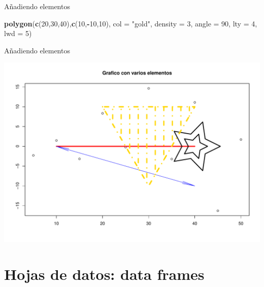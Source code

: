 \documentclass[
  ignorenonframetext,
]{beamer}
\newenvironment{Shaded}{\begin{snugshade}}{\end{snugshade}}
\newcommand{\AttributeTok}[1]{\textcolor[rgb]{0.13,0.29,0.53}{#1}}
\newcommand{\DecValTok}[1]{\textcolor[rgb]{0.00,0.00,0.81}{#1}}
\newcommand{\FunctionTok}[1]{\textcolor[rgb]{0.13,0.29,0.53}{\textbf{#1}}}
\newcommand{\NormalTok}[1]{#1}
\newcommand{\SpecialCharTok}[1]{\textcolor[rgb]{0.81,0.36,0.00}{\textbf{#1}}}
\newcommand{\StringTok}[1]{\textcolor[rgb]{0.31,0.60,0.02}{#1}}
\begin{document}
\begin{frame}[fragile]{Añadiendo elementos}
\begin{Shaded}
\begin{Highlighting}[]
\FunctionTok{polygon}\NormalTok{(}\FunctionTok{c}\NormalTok{(}\DecValTok{20}\NormalTok{,}\DecValTok{30}\NormalTok{,}\DecValTok{40}\NormalTok{),}\FunctionTok{c}\NormalTok{(}\DecValTok{10}\NormalTok{,}\SpecialCharTok{{-}}\DecValTok{10}\NormalTok{,}\DecValTok{10}\NormalTok{), }\AttributeTok{col =} \StringTok{"gold"}\NormalTok{,}
        \AttributeTok{density =} \DecValTok{3}\NormalTok{, }\AttributeTok{angle =} \DecValTok{90}\NormalTok{, }\AttributeTok{lty =} \DecValTok{4}\NormalTok{, }
        \AttributeTok{lwd =} \DecValTok{5}\NormalTok{)}
\end{Highlighting}
\end{Shaded}
\end{frame}

\begin{frame}{Añadiendo elementos}
\label{auxf1adiendo-elementos-1}
\begin{center}\includegraphics[width=0.8\linewidth]{R_base_files/figure-beamer/unnamed-chunk-46-1} \end{center}
\end{frame}

\section{Hojas de datos: data frames}\label{hojas-de-datos-data-frames}
\end{document}
